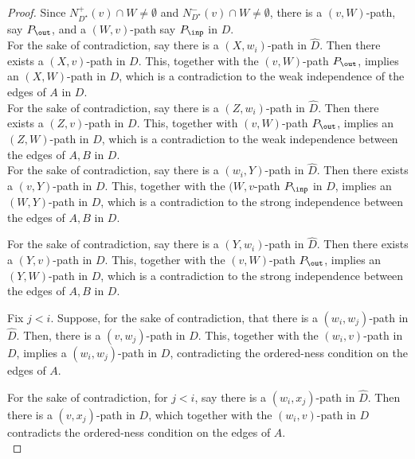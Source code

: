 \begin{proof}
Since  $N_{D^{\star}}^+(v) \cap W \neq \emptyset$ and $N_{D^{\star}}^-(v) \cap W \neq \emptyset$, 
there is a $(v,W)$-path, say $P_{\out}$, and a $(W,v)$-path say $P_{\inp}$ in $D$.\\

 For the sake of contradiction, say there is a $(X,w_i)$-path in $\widehat{D}$. Then there exists a $(X,v)$-path in $D$. This, together with the $(v,W)$-path $P_{\out}$, implies an $(X,W)$-path in $D$, which is a contradiction to the weak independence of the edges of $A$ in $D$.\\

 For the sake of contradiction, say there is a $(Z,w_i)$-path in $\widehat{D}$. 
Then there exists a $(Z,v)$-path in $D$. This, together with $(v,W)$-path $P_{\out}$, implies an $(Z,W)$-path in $D$, which is a contradiction to the weak independence between the edges of $A, B$ in $D$.\\

 For the sake of contradiction, 
say there is a $(w_i,Y)$-path in $\widehat{D}$. 
Then there exists a $(v,Y)$-path in $D$. This, together with the $(W,v$-path $P_{\inp}$ in $D$, implies an $(W,Y)$-path in $D$, which is a contradiction to the strong independence between the edges of $A, B$ in $D$.

For the sake of contradiction, 
say there is a $(Y,w_i)$-path in $\widehat{D}$. 
Then there exists a $(Y,v)$-path in $D$. This, together with the $(v,W)$-path $P_{\out}$, implies an $(Y,W)$-path in $D$, which is a contradiction to the strong independence between the edges of $A, B$ in $D$.

 Fix $j <i$. Suppose, for the sake of contradiction, that there is a $(w_i,w_j)$-path in $\widehat{D}$. Then, there is a $(v,w_j)$-path in $D$. This, together with the $(w_i,v)$-path in $D$, implies a $(w_i,w_j)$-path in $D$, contradicting the ordered-ness condition on the edges of $A$.

For the sake of contradiction, for $j <i$, say there is a $(w_i,x_j)$-path in $\widehat{D}$. Then there is a $(v,x_j)$-path in $D$, which together with the $(w_i,v)$-path in $D$ contradicts the ordered-ness condition on the edges of $A$.\\


\end{proof}
